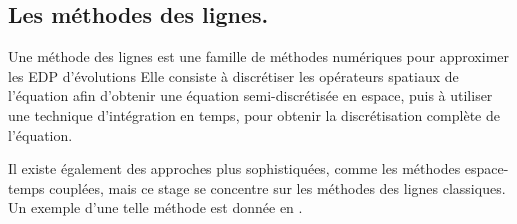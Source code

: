     \subsection{Les méthodes des lignes.}
    \begin{definition}
        Une méthode des lignes est une famille de méthodes numériques pour approximer les EDP d'évolutions
        Elle consiste à discrétiser les opérateurs spatiaux de l'équation afin d'obtenir une équation semi-discrétisée en espace,
        puis à utiliser une technique d'intégration en temps, pour obtenir la discrétisation complète de l'équation.
    \end{definition}

    Il existe également des approches plus sophistiquées, comme les méthodes espace-temps couplées, mais ce stage se concentre sur les méthodes des lignes classiques. Un exemple d'une telle méthode est donnée en \cite{DARU2004563}.
